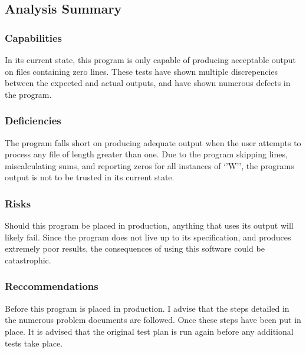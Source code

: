 \documentclass[]{article}
\begin{document}
	\newpage
	

\subsection{Analysis Summary}

	\subsubsection{Capabilities}
	In its current state, this program is only capable of producing acceptable
	output on files containing zero lines.  These tests have shown multiple
	discrepencies between the expected and actual outputs, and have shown numerous
	defects in the program.
	
	\subsubsection{Deficiencies}
	The program falls short on producing adequate output when the user attempts to
	process any file of length greater than one.  Due to the program skipping
	lines, miscalculating sums, and reporting zeros for all instances of `'W'', the
	programs output is not to be trusted in its current state.
	
	\subsubsection{Risks}
	Should this program be placed in production, anything that uses its output will
	likely fail.  Since the program does not live up to its specification, and
	produces extremely poor results, the consequences of using this software could
	be catastrophic.
	
	\subsubsection{Reccommendations}
	Before this program is placed in production.  I advise that the steps detailed
	in the numerous problem documents are followed.  Once these steps have been put
	in place.  It is advised that the original test plan is run again before any
	additional tests take place.
	
\end{document}
